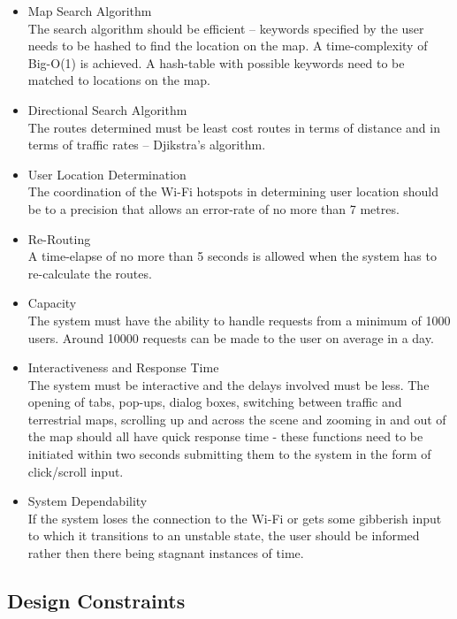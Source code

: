 \documentclass[runningheads,a4paper]{article}
\begin{document}
\begin{itemize}
\item Map Search Algorithm\\The search algorithm should be efficient – keywords specified by the user needs to be hashed to find the location on the map. A time-complexity of Big-O(1) is achieved. A hash-table with possible keywords need to be matched to locations on the map.

\item Directional Search Algorithm\\The routes determined must be least cost routes in terms of distance and in terms of traffic rates – Djikstra’s algorithm.

\item User Location Determination\\The coordination of the Wi-Fi hotspots in determining user location should be to a precision that allows an error-rate of no more than 7 metres.

\item Re-Routing\\A time-elapse of no more than 5 seconds is allowed when the system has to re-calculate the routes.

\item Capacity\\The system must have the ability to handle requests from a minimum of 1000 users. Around 10000 requests can be made to the user on average in a day.

\item Interactiveness and Response Time\\The system must be interactive and the delays involved must be less. The opening of tabs, pop-ups, dialog boxes, switching between traffic and terrestrial maps, scrolling up and across the scene and zooming in and out of the map should all have quick response time - these functions need to be initiated within two seconds submitting them to the system in the form of click/scroll input.

\item System Dependability\\If the system loses the connection to the Wi-Fi or gets some gibberish input to which it transitions to an unstable state, the user should be informed rather then there being stagnant instances of time.

\end{itemize}

\subsection{Design Constraints}
\end{document}
